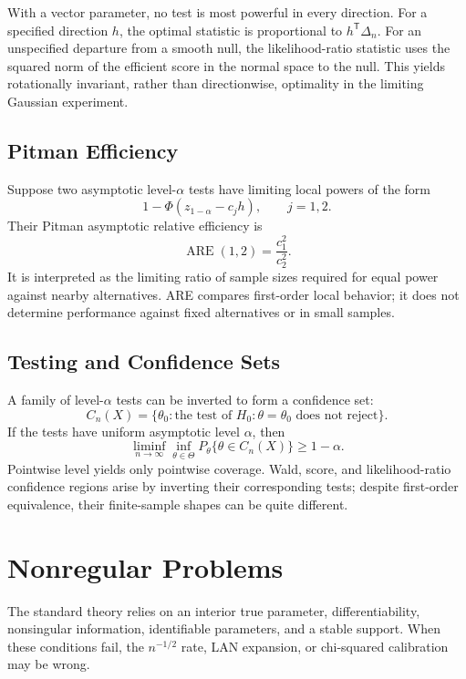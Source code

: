 \documentclass[12pt,oneside]{book}
\numberwithin{equation}{section}
\theoremstyle{definition}
\theoremstyle{plain}
\theoremstyle{remark}
\begin{document}
With a vector parameter, no test is most powerful in every direction.  For a
specified direction $h$, the optimal statistic is proportional to
$h^\mathsf T\Delta_n$.  For an unspecified departure from a smooth null,
the likelihood-ratio statistic uses the squared norm of the efficient score
in the normal space to the null.  This yields rotationally invariant, rather
than directionwise, optimality in the limiting Gaussian experiment.

\subsection{Pitman Efficiency}

Suppose two asymptotic level-$\alpha$ tests have limiting local powers of the
form
\[
    1-\Phi(z_{1-\alpha}-c_jh),\qquad j=1,2.
\]
Their Pitman asymptotic relative efficiency is
\[
    \operatorname{ARE}(1,2)=\frac{c_1^2}{c_2^2}.
\]
It is interpreted as the limiting ratio of sample sizes required for equal
power against nearby alternatives.  ARE compares first-order local behavior;
it does not determine performance against fixed alternatives or in small
samples.

\subsection{Testing and Confidence Sets}

A family of level-$\alpha$ tests can be inverted to form a confidence set:
\[
    C_n(X)=\{\theta_0:\text{the test of }H_0:\theta=\theta_0
                   \text{ does not reject}\}.
\]
If the tests have uniform asymptotic level $\alpha$, then
\[
    \liminf_{n\to\infty}\inf_{\theta\in\Theta}
    P_\theta\{\theta\in C_n(X)\}\geq1-\alpha.
\]
Pointwise level yields only pointwise coverage.  Wald, score, and
likelihood-ratio confidence regions arise by inverting their corresponding
tests; despite first-order equivalence, their finite-sample shapes can be
quite different.

\section{Nonregular Problems}

The standard theory relies on an interior true parameter, differentiability,
nonsingular information, identifiable parameters, and a stable support.
When these conditions fail, the $n^{-1/2}$ rate, LAN expansion, or chi-squared
calibration may be wrong.
\end{document}
